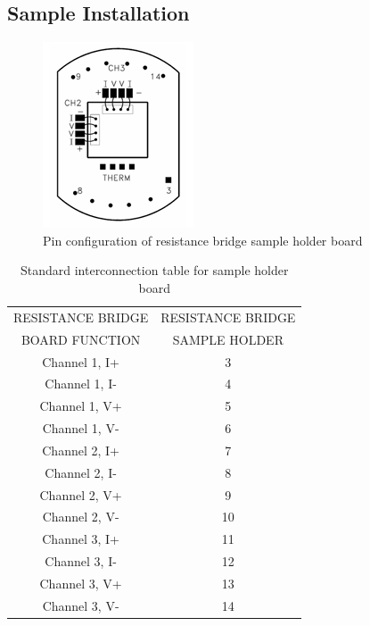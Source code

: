 \documentclass{article}
\begin{document}
    \subsection{Sample Installation}
    
            \begin{figure}[H]
                \centering
                \includegraphics[width=0.25\linewidth]{pin out.png}
                \caption{Pin configuration of resistance bridge sample holder board}
                \label{pin out}
            \end{figure}
            \begin{table}[H]
                \centering
                \begin{tabular}{|c|c|}
                \hline
                   RESISTANCE BRIDGE & RESISTANCE BRIDGE\\
                   BOARD FUNCTION & SAMPLE HOLDER\\
                   \hline
                   Channel 1, I+ & 3    \\  \hline
                   Channel 1, I- & 4    \\  \hline
                   Channel 1, V+ & 5    \\  \hline
                   Channel 1, V- & 6    \\  \hline
                   Channel 2, I+ & 7    \\  \hline
                   Channel 2, I- & 8    \\  \hline
                   Channel 2, V+ & 9    \\  \hline
                   Channel 2, V- & 10   \\  \hline
                   Channel 3, I+ & 11   \\  \hline
                   Channel 3, I- & 12   \\  \hline
                   Channel 3, V+ & 13   \\  \hline
                   Channel 3, V- & 14   \\  \hline
                \end{tabular}
                \caption{Standard interconnection table for sample holder board}
                \label{interconn}
            \end{table}
            
\end{document}
